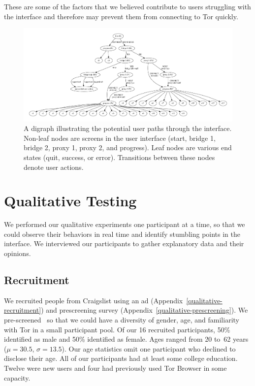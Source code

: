 \documentclass[USenglish,oneside,twocolumn]{article}
\begin{document}
These are some of the factors that we believed contribute to users struggling with the interface and therefore may prevent them from connecting to Tor quickly.


\begin{figure}
\centering
\includegraphics[width=\textwidth]{torconfig.pdf}
\caption{
A digraph illustrating the potential user paths through the interface. Non-leaf nodes are screens in the user interface (start, bridge 1, bridge 2, proxy 1, proxy 2, and progress). Leaf nodes are various end states (quit, success, or error). Transitions between these nodes denote user actions. 
}
\label{fig:digraph}
\end{figure} 

\section{Qualitative Testing}
\label{sec:qualitative}
We performed our qualitative experiments one participant at a time, so that we could observe their behaviors in real time and identify stumbling points in the interface.
We interviewed our participants to gather explanatory data and their opinions.

\subsection{Recruitment}
We recruited people from Craigslist using an ad (Appendix~\ref{qualitative-recruitment}) and prescreening survey (Appendix~\ref{qualitative-prescreening}). We pre-screened~\cite{screening} so that we could have a diversity of gender, age, and familiarity with Tor in a small participant pool. Of our 16 recruited participants, 50\% identified as male and 50\% identified as female. Ages ranged from 20 to~62 years ($\mu = 30.5$, $\sigma = 13.5$). Our age statistics omit one participant who declined to disclose their age. All of our participants had at least some college education. Twelve were new users and four had previously used Tor Browser in some capacity.  
\end{document}

